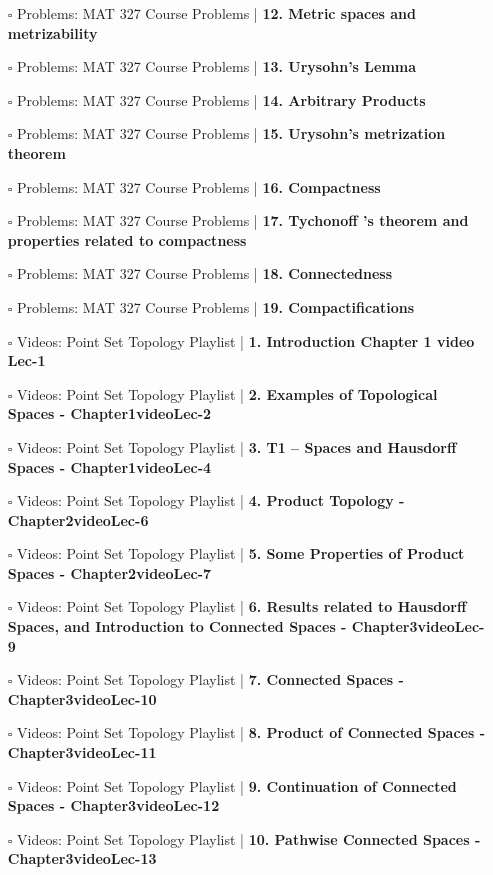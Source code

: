 \documentclass[a4, landscape, 12pt]{article}
\newcommand{\checkbox}{$\square$}%
\begin{document}
\begin{itemize}
{}
\item [\checkbox] Problems: MAT 327 Course Problems  | \textbf{12. Metric spaces and metrizability
}
\item [\checkbox] Problems: MAT 327 Course Problems  | \textbf{13. Urysohn’s Lemma
}
\item [\checkbox] Problems: MAT 327 Course Problems  | \textbf{14. Arbitrary Products
}
\item [\checkbox] Problems: MAT 327 Course Problems  | \textbf{15. Urysohn’s metrization theorem
}
\item [\checkbox] Problems: MAT 327 Course Problems  | \textbf{16. Compactness
}
\item [\checkbox] Problems: MAT 327 Course Problems  | \textbf{17. Tychonoff ’s theorem and properties related to compactness
}
\item [\checkbox] Problems: MAT 327 Course Problems  | \textbf{18. Connectedness
}
\item [\checkbox] Problems: MAT 327 Course Problems  | \textbf{19. Compactifications
}
\item [\checkbox] Videos: Point Set Topology Playlist  | \textbf{1. Introduction Chapter 1 video Lec-1
}
\item [\checkbox] Videos: Point Set Topology Playlist  | \textbf{2. Examples of Topological Spaces - Chapter1videoLec-2
}
\item [\checkbox] Videos: Point Set Topology Playlist  | \textbf{3. T1 – Spaces and Hausdorff Spaces - Chapter1videoLec-4
}
\item [\checkbox] Videos: Point Set Topology Playlist  | \textbf{4. Product Topology - Chapter2videoLec-6
}
\item [\checkbox] Videos: Point Set Topology Playlist  | \textbf{5. Some Properties of Product Spaces - Chapter2videoLec-7
}
\item [\checkbox] Videos: Point Set Topology Playlist  | \textbf{6. Results related to Hausdorff Spaces, and Introduction to Connected Spaces - Chapter3videoLec-9
}
\item [\checkbox] Videos: Point Set Topology Playlist  | \textbf{7. Connected Spaces - Chapter3videoLec-10
}
\item [\checkbox] Videos: Point Set Topology Playlist  | \textbf{8. Product of Connected Spaces - Chapter3videoLec-11
}
\item [\checkbox] Videos: Point Set Topology Playlist  | \textbf{9. Continuation of Connected Spaces  - Chapter3videoLec-12
}
\item [\checkbox] Videos: Point Set Topology Playlist  | \textbf{10. Pathwise Connected Spaces - Chapter3videoLec-13
}
\end{itemize}
\end{document}
